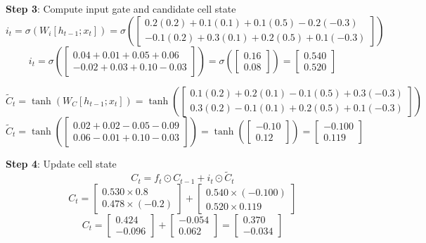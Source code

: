 \documentclass[11pt,a4paper]{article}
\begin{document}
\begin{tcolorbox}[colback=green!5!white,colframe=green!75!black,title=\textbf{Worked Example 22: LSTM Gate Computations}]
\textbf{Step 3}: Compute input gate and candidate cell state
\[
i_t = \sigma(W_i [h_{t-1}; x_t]) = \sigma\left(\begin{bmatrix} 0.2(0.2) + 0.1(0.1) + 0.1(0.5) - 0.2(-0.3) \\ -0.1(0.2) + 0.3(0.1) + 0.2(0.5) + 0.1(-0.3) \end{bmatrix}\right)
\]
\[
i_t = \sigma\left(\begin{bmatrix} 0.04 + 0.01 + 0.05 + 0.06 \\ -0.02 + 0.03 + 0.10 - 0.03 \end{bmatrix}\right) = \sigma\left(\begin{bmatrix} 0.16 \\ 0.08 \end{bmatrix}\right) = \begin{bmatrix} 0.540 \\ 0.520 \end{bmatrix}
\]

\[
\tilde{C}_t = \tanh(W_C [h_{t-1}; x_t]) = \tanh\left(\begin{bmatrix} 0.1(0.2) + 0.2(0.1) - 0.1(0.5) + 0.3(-0.3) \\ 0.3(0.2) - 0.1(0.1) + 0.2(0.5) + 0.1(-0.3) \end{bmatrix}\right)
\]
\[
\tilde{C}_t = \tanh\left(\begin{bmatrix} 0.02 + 0.02 - 0.05 - 0.09 \\ 0.06 - 0.01 + 0.10 - 0.03 \end{bmatrix}\right) = \tanh\left(\begin{bmatrix} -0.10 \\ 0.12 \end{bmatrix}\right) = \begin{bmatrix} -0.100 \\ 0.119 \end{bmatrix}
\]

\textbf{Step 4}: Update cell state
\[
C_t = f_t \odot C_{t-1} + i_t \odot \tilde{C}_t
\]
\[
C_t = \begin{bmatrix} 0.530 \times 0.8 \\ 0.478 \times (-0.2) \end{bmatrix} + \begin{bmatrix} 0.540 \times (-0.100) \\ 0.520 \times 0.119 \end{bmatrix}
\]
\[
C_t = \begin{bmatrix} 0.424 \\ -0.096 \end{bmatrix} + \begin{bmatrix} -0.054 \\ 0.062 \end{bmatrix} = \begin{bmatrix} 0.370 \\ -0.034 \end{bmatrix}
\]


\end{tcolorbox}
\end{document}
